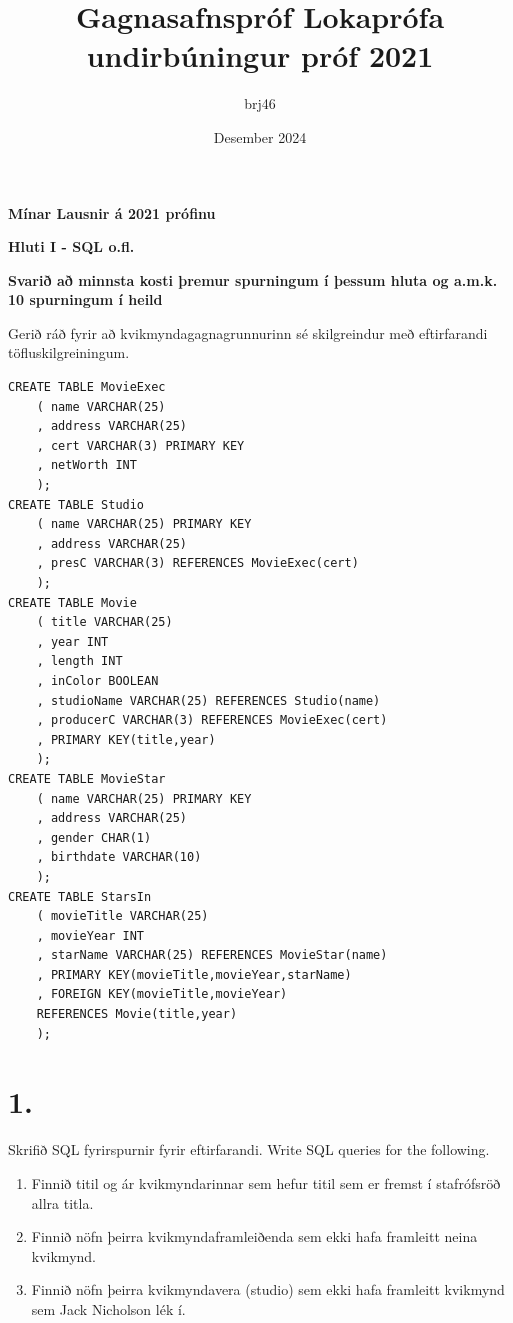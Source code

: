 \documentclass{article}
\title{Gagnasafnspróf Lokaprófa undirbúningur próf 2021}
\author{brj46 }
\date{Desember 2024}
\newcommand{\bo}[1]{\textbf{#1}}
\newcommand{\enum}{\begin{enumerate}[label = \alph*.]}
\begin{document}
\maketitle

\begin{center}
\LARGE{\textbf{Mínar Lausnir á 2021 prófinu}}
\end{center}

\newpage

\begin{center}
    \bo{Hluti I - SQL o.fl.}
\end{center}

\bo{Svarið að minnsta kosti þremur spurningum í þessum hluta og a.m.k. 10 spurningum í heild}


Gerið ráð fyrir að kvikmyndagagnagrunnurinn sé skilgreindur með
eftirfarandi töfluskilgreiningum.

\begin{verbatim}
CREATE TABLE MovieExec
    ( name VARCHAR(25)
    , address VARCHAR(25)
    , cert VARCHAR(3) PRIMARY KEY
    , netWorth INT
    );
CREATE TABLE Studio
    ( name VARCHAR(25) PRIMARY KEY
    , address VARCHAR(25)
    , presC VARCHAR(3) REFERENCES MovieExec(cert)
    );
CREATE TABLE Movie
    ( title VARCHAR(25)
    , year INT
    , length INT
    , inColor BOOLEAN
    , studioName VARCHAR(25) REFERENCES Studio(name)
    , producerC VARCHAR(3) REFERENCES MovieExec(cert)
    , PRIMARY KEY(title,year)
    );
CREATE TABLE MovieStar
    ( name VARCHAR(25) PRIMARY KEY
    , address VARCHAR(25)
    , gender CHAR(1)
    , birthdate VARCHAR(10)
    );
CREATE TABLE StarsIn
    ( movieTitle VARCHAR(25)
    , movieYear INT
    , starName VARCHAR(25) REFERENCES MovieStar(name)
    , PRIMARY KEY(movieTitle,movieYear,starName)
    , FOREIGN KEY(movieTitle,movieYear)
    REFERENCES Movie(title,year)
    );

\end{verbatim}
\section{1.}
Skrifið SQL fyrirspurnir fyrir eftirfarandi. Write SQL queries for the
following.

\enum
\item Finnið titil og ár kvikmyndarinnar sem hefur titil sem er fremst
í stafrófsröð allra titla.
\item Finnið nöfn þeirra kvikmyndaframleiðenda sem ekki hafa
framleitt neina kvikmynd.
\item Finnið nöfn þeirra kvikmyndavera (studio) sem ekki hafa
framleitt kvikmynd sem Jack Nicholson lék í.
\end{enumerate}
\end{document}
